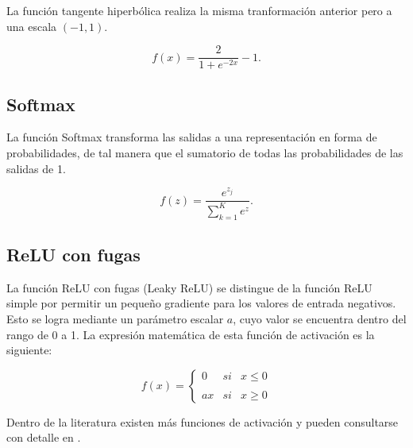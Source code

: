 \documentclass[
  us-letterpaper,
]{scrreprt}
\theoremstyle{plain}
\theoremstyle{definition}
\theoremstyle{definition}
\theoremstyle{remark}
\begin{document}
La función tangente hiperbólica realiza la misma tranformación anterior
pero a una escala \((-1,1)\).

\[ f(x) =\dfrac{2}{1+e^{-2x}} -1 .\]

\subsection{Softmax}\label{softmax}

La función Softmax transforma las salidas a una representación en forma
de probabilidades, de tal manera que el sumatorio de todas las
probabilidades de las salidas de 1.

\[f(z)= \dfrac{e^{z_j}}{\displaystyle \sum_{k=1}^{K} e^z} .\]

\subsection{ReLU con fugas}\label{relu-con-fugas}

La función ReLU con fugas (Leaky ReLU) se distingue de la función ReLU
simple por permitir un pequeño gradiente para los valores de entrada
negativos. Esto se logra mediante un parámetro escalar \(a\), cuyo valor
se encuentra dentro del rango de 0 a 1. La expresión matemática de esta
función de activación es la siguiente:

\[ f(x) = 
    \left\{ \begin{array}{lcc} 0 & si & x \leq 0 \\ \\ a x & si & x \geq  0  \end{array} \right . \]

Dentro de la literatura existen más funciones de activación y pueden
consultarse con detalle en \textcite{apicella2021survey}.
\end{document}
